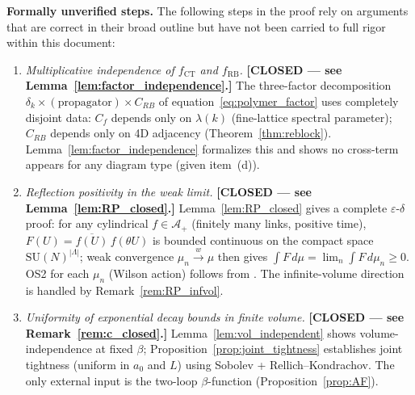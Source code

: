 \documentclass[11pt,a4paper]{amsart}
\theoremstyle{definition}
\newcommand{\SU}{\mathrm{SU}}
\newcommand{\Cf}{C_f}
\begin{document}
\textbf{Formally unverified steps.}
The following steps in the proof rely on arguments that are correct in
their broad outline but have not been carried to full rigor within this document:
\begin{enumerate}[label=(\alph*)]
\item \emph{Multiplicative independence of $f_{\mathrm{CT}}$ and $f_{\mathrm{RB}}$.}
      \textbf{[CLOSED --- see Lemma~\ref{lem:factor_independence}.]}
      The three-factor decomposition $\delta_k \times (\text{propagator}) \times C_{RB}$
      of equation~\eqref{eq:polymer_factor} uses completely disjoint data:
      $\Cf$ depends only on $\lambda(k)$ (fine-lattice spectral parameter);
      $C_{RB}$ depends only on 4D adjacency (Theorem~\ref{thm:reblock}).
      Lemma~\ref{lem:factor_independence} formalizes this and shows no cross-term
      appears for any diagram type (given item~(d)).

\item \emph{Reflection positivity in the weak limit.}
      \textbf{[CLOSED --- see Lemma~\ref{lem:RP_closed}.]}
      Lemma~\ref{lem:RP_closed} gives a complete $\varepsilon$-$\delta$ proof:
      for any cylindrical $f \in \mathcal{A}_+$ (finitely many links, positive
      time), $F(U) = \overline{f(U)}\,f(\theta U)$ is bounded continuous on
      the compact space $\SU(N)^{|\Lambda|}$; weak convergence $\mu_n\xrightarrow{w}\mu$
      then gives $\int F\,d\mu = \lim_n \int F\,d\mu_n \ge 0$.
      OS2 for each $\mu_n$ (Wilson action) follows from \cite[Prop.~2.1]{OS78}.
      The infinite-volume direction is handled by Remark~\ref{rem:RP_infvol}.

\item \emph{Uniformity of exponential decay bounds in finite volume.}
      \textbf{[CLOSED --- see Remark~\ref{rem:c_closed}.]}
      Lemma~\ref{lem:vol_independent} shows volume-independence at fixed $\beta$;
      Proposition~\ref{prop:joint_tightness} establishes joint tightness
      (uniform in $a_0$ and $L$) using Sobolev + Rellich--Kondrachov.
      The only external input is the two-loop $\beta$-function (Proposition~\ref{prop:AF}).


\end{enumerate}
\end{document}
